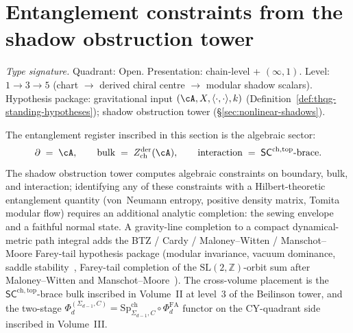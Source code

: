 
\section{Entanglement constraints from the shadow obstruction tower}
\label{sec:thqg-entanglement-programme}

\begin{remark}
\label{rem:thqg-ent-algebraic-sector}
\textit{Type signature.}
Quadrant: Open. Presentation: chain-level + $(\infty,1)$.
Level: $1 \to 3 \to 5$ (chart $\to$ derived chiral centre $\to$
modular shadow scalars).
Hypothesis package: gravitational input $(\cA, X, \langle \cdot, \cdot
\rangle, k)$
\textup{(}Definition~\ref{def:thqg-standing-hypotheses}\textup{)};
shadow obstruction tower
\textup{(}\S\ref{sec:nonlinear-shadows}\textup{)}.
\medskip

The entanglement register inscribed in this section is the algebraic
sector:
\begin{equation}\label{eq:thqg-ent-algebraic-sector}
\partial \;=\; \cA, \qquad
\mathrm{bulk} \;=\; Z^{\mathrm{der}}_{\mathrm{ch}}(\cA), \qquad
\mathrm{interaction} \;=\; \mathsf{SC}^{\mathrm{ch,top}}\text{-brace}.
\end{equation}
The shadow obstruction tower computes algebraic constraints on
boundary, bulk, and interaction; identifying any of these constraints
with a Hilbert-theoretic entanglement quantity (von~Neumann entropy,
positive density matrix, Tomita modular flow) requires an additional
analytic completion: the sewing envelope and a faithful normal state.
A gravity-line completion to a compact dynamical-metric path integral
adds the BTZ / Cardy / Maloney--Witten / Manschot--Moore Farey-tail
hypothesis package \textup{(}modular invariance, vacuum dominance,
saddle stability~\cite{BTZ92,Cardy86}, Farey-tail completion of the
$\mathrm{SL}(2,\mathbb{Z})$-orbit sum after Maloney--Witten and
Manschot--Moore~\cite{Maloney-Witten07}\textup{)}.
The cross-volume placement is the
$\mathsf{SC}^{\mathrm{ch,top}}$-brace bulk inscribed in Volume~II at
level~$3$ of the Beilinson tower, and the two-stage
$\Phi_d^{(\Sigma_{d-1}, C)} = \mathrm{Sp}^{\mathrm{ch}}_{\Sigma_{d-1},
C} \circ \Phi_d^{\mathrm{FA}}$ functor on the CY-quadrant side
inscribed in Volume~III.
\end{remark}

